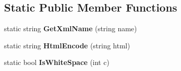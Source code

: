 \subsection*{Static Public Member Functions}
\begin{DoxyCompactItemize}
\item 
\mbox{\label{class_html_agility_pack_1_1_html_document_af507693cf3163da776a2f12feb4ea5ce}} 
static string {\bfseries Get\+Xml\+Name} (string name)
\item 
\mbox{\label{class_html_agility_pack_1_1_html_document_a0fcf3caaf1a43613da81853b334cb6b0}} 
static string {\bfseries Html\+Encode} (string html)
\item 
\mbox{\label{class_html_agility_pack_1_1_html_document_a133cce0bd1abffb920568b6412736f89}} 
static bool {\bfseries Is\+White\+Space} (int c)
\end{DoxyCompactItemize}
